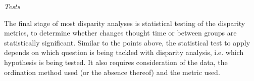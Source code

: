 \documentclass[12pt,letterpaper]{article}
\renewcommand{\subsection}[1]{%
\bigskip
\begin{center}
\begin{large}
\normalfont\itshape #1
\end{large}
\end{center}}
\begin{document}



\subsection{Tests}
The final stage of most disparity analyses is statistical testing of the disparity metrics, to determine whether changes thought time or between groups are statistically significant. 
Similar to the points above, the statistical test to apply depends on which question is being tackled with disparity analysis, i.e. which hypothesis is being tested.
It also requires consideration of the data, the ordination method used (or the absence thereof) and the metric used.
\end{document}
